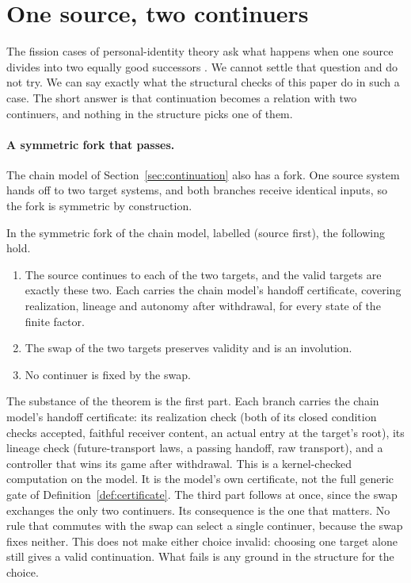 \section{One source, two continuers}
\label{sec:branching}

The fission cases of personal-identity theory ask what happens when one source
divides into two equally good successors \citep{Parfit1984, Olson2023SEP}. We
cannot settle that question and do not try. We can say exactly what the
structural checks of this paper do in such a case. The short answer is that
continuation becomes a relation with two continuers, and nothing in the
structure picks one of them.

\paragraph{A symmetric fork that passes.}
The chain model of Section~\ref{sec:continuation} also has a fork. One source
system hands off to two target systems, and both branches receive identical
inputs, so the fork is symmetric by construction.

\begin{theorem}
\label{thm:fork}
In the symmetric fork of the chain model, labelled
\snapGSevenForkSystemIds{} (source first), the following hold.
\begin{enumerate}
\item The source continues to each of the two targets, and the valid targets
are exactly these two. Each carries the chain model's handoff certificate,
covering realization, lineage and autonomy after withdrawal, for every state of
the finite factor.
\item The swap of the two targets preserves validity and is an involution.
\item No continuer is fixed by the swap.
\end{enumerate}
\end{theorem}

The substance of the theorem is the first part. Each branch carries the chain
model's handoff certificate: its realization check (both of its closed condition checks
accepted, faithful receiver content, an actual entry at the target's root), its
lineage check (future-transport laws, a passing handoff, raw transport), and a
controller that wins its game after withdrawal. This is a kernel-checked
computation on the model. It is the model's own certificate, not the full
generic gate of Definition~\ref{def:certificate}. The third part follows at once, since the swap exchanges the only
two continuers. Its consequence is the one that matters. No rule that commutes
with the swap can select a single continuer, because the swap fixes neither.
This does not make either choice invalid: choosing one target alone still
gives a valid continuation. What fails is any ground in the structure for the
choice.

